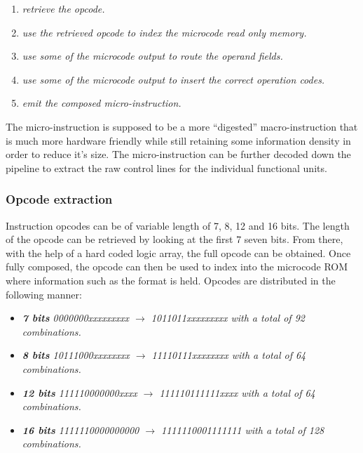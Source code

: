            \begin{enumerate}

                \item \textit{retrieve the opcode.}
                \item \textit{use the retrieved opcode to index the microcode read only memory.}
                \item \textit{use some of the microcode output to route the operand fields.}
                \item \textit{use some of the microcode output to insert the correct operation codes.}
                \item \textit{emit the composed micro-instruction.}

            \end{enumerate}

            The micro-instruction is supposed to be a more ``digested'' macro-instruction that is much more hardware friendly while still retaining some information density in order to reduce it's size. The micro-instruction can be further decoded down the pipeline to extract the raw control lines for the individual functional units.

            \subsubsection{Opcode extraction}

                \vspace{10pt}

                Instruction opcodes can be of variable length of 7, 8, 12 and 16 bits. The length of the opcode can be retrieved by looking at the first 7 seven bits. From there, with the help of a hard coded logic array, the full opcode can be obtained. Once fully composed, the opcode can then be used to index into the microcode ROM where information such as the format is held. Opcodes are distributed in the following manner:

                \begin{itemize}

                    \item \textit{\textbf{7 bits} 0000000xxxxxxxxx $\rightarrow$ 1011011xxxxxxxxx with a total of 92 combinations.}
                    \item \textit{\textbf{8 bits} 10111000xxxxxxxx $\rightarrow$ 11110111xxxxxxxx with a total of 64 combinations.}
                    \item \textit{\textbf{12 bits} 111110000000xxxx $\rightarrow$ 111110111111xxxx with a total of 64 combinations.}
                    \item \textit{\textbf{16 bits} 1111110000000000 $\rightarrow$ 1111110001111111 with a total of 128 combinations.}

                \end{itemize}

